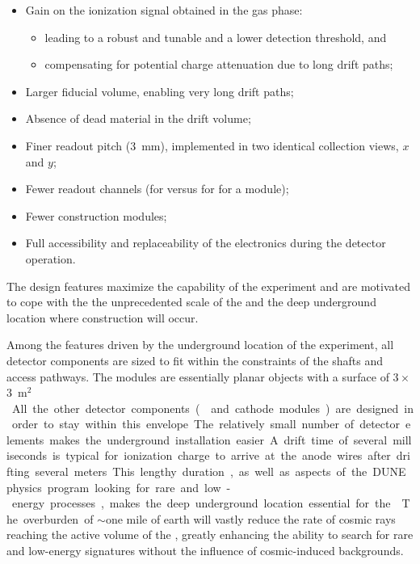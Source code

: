 \begin{itemize}
\item Gain on the ionization signal obtained in the gas phase:
\begin{itemize}
\item  leading to a robust and tunable  and a lower detection threshold, and
\item  compensating for potential charge attenuation due to long drift paths; 
\end{itemize}
\item  Larger fiducial volume, enabling very long drift paths;
\item  Absence of dead material in the \lar drift volume;
\item  Finer readout pitch (\SI{3}{mm}), implemented in two identical collection views, $x$ and $y$;
\item  Fewer readout channels (\dpnumcrpch for \dual versus \spnumch for \single for a  \nominalmodsize module); 
\item  Fewer construction modules;
\item  Full accessibility and replaceability of the  electronics during the detector operation.

\end{itemize}

 The \dual design features maximize the capability of the experiment and are motivated to cope with the the unprecedented scale of the  and the deep underground location where construction will occur.

Among the features driven by the underground location of the experiment, all detector components are sized to fit within the constraints of the \surf shafts and access pathways. The  modules are essentially planar objects with a surface of \num{3}\,$\times$\,\SI{3}{m$^2$}. All the other detector %
components ( and cathode modules) are %
designed in order to stay within this envelope. The relatively small number of detector elements makes the underground installation easier.

A drift time of several milliseconds is typical for ionization charge to arrive at the anode wires after drifting several meters.  This lengthy duration, as well as aspects of the DUNE physics program looking for rare and low-energy processes, makes the deep underground location essential for the .  The overburden of $\sim$one mile of earth will vastly reduce the rate of cosmic rays reaching the active volume of the , greatly enhancing the ability to search for rare and low-energy signatures without the influence of cosmic-induced backgrounds.  






